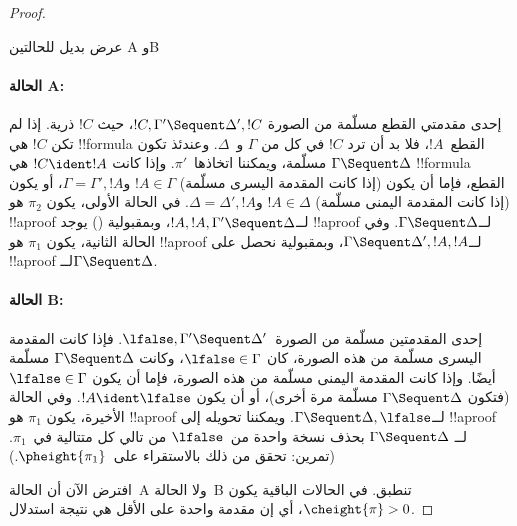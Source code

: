 \documentclass[../../../include/open-logic-section]{subfiles}
\begin{document}
\begin{proof}
\begin{center}
عرض بديل للحالتين A وB
\end{center}

\paragraph{الحالة A:} إحدى مقدمتي القطع مسلّمة من الصورة $!C, \Gamma'
\Sequent \Delta', !C$، حيث $!C$ ذرية. إذا لم تكن $!C$ هي !!{formula}
القطع~$!A$، فلا بد أن ترد $!C$ في كل من $\Gamma$ و~$\Delta$. وعندئذ تكون
$\Gamma \Sequent \Delta$ مسلّمة، ويمكننا اتخاذها~$\pi'$. وإذا كانت
$!C\ident !A$ هي !!{formula} القطع، فإما أن يكون (إذا كانت المقدمة اليسرى
مسلّمة) $!A\in\Gamma$ و$\Gamma=\Gamma', !A$، أو يكون (إذا كانت المقدمة
اليمنى مسلّمة) $!A\in\Delta$ و$\Delta=\Delta', !A$. في الحالة الأولى،
يكون $\pi_2$ هو !!a{proof} لــ$!A, !A, \Gamma' \Sequent \Delta$، وبمقبولية
\LeftR{\Contraction} () يوجد !!a{proof}
لــ$\Gamma \Sequent \Delta$. وفي الحالة الثانية، يكون $\pi_1$ هو
!!a{proof} لــ$\Gamma \Sequent \Delta', !A, !A$، وبمقبولية
\RightR{\Contraction} نحصل على !!a{proof} لــ$\Gamma \Sequent \Delta$.

\paragraph{الحالة B:} إحدى المقدمتين مسلّمة من الصورة~$\lfalse,
\Gamma' \Sequent \Delta'$. فإذا كانت المقدمة اليسرى مسلّمة من هذه الصورة،
كان $\lfalse\in\Gamma$، وكانت $\Gamma \Sequent \Delta$ مسلّمة أيضًا.
وإذا كانت المقدمة اليمنى مسلّمة من هذه الصورة، فإما أن يكون
$\lfalse\in\Gamma$ (فتكون $\Gamma \Sequent \Delta$ مسلّمة مرة أخرى)، أو
أن يكون $!A\ident\lfalse$. وفي الحالة الأخيرة، يكون $\pi_1$ هو !!a{proof}
لــ$\Gamma \Sequent \Delta, \lfalse$. ويمكننا تحويله إلى !!a{proof} لــ
$\Gamma \Sequent \Delta$ بحذف نسخة واحدة من~$\lfalse$ من تالي كل متتالية
في~$\pi_1$. (تمرين: تحقق من ذلك بالاستقراء على~$\pheight{\pi_1}$.)

افترض الآن أن الحالة~A ولا الحالة~B تنطبق. في الحالات الباقية يكون
$\cheight{\pi}>0$، أي إن مقدمة واحدة على الأقل هي نتيجة استدلال.


\end{proof}
\end{document}
